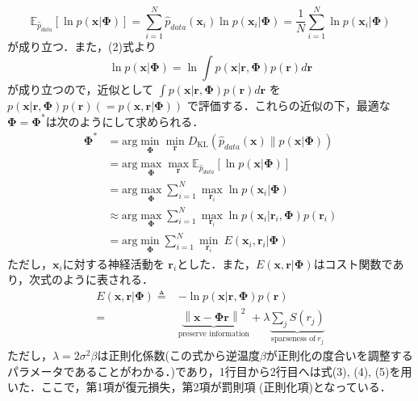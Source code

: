 \begin{equation}
\mathbb{E}_{\hat{p}_{data}} \left[\ln p(\mathbf{x}|\mathbf{\Phi})\right]=\sum_{i=1}^N \hat{p}_{data}(\mathbf{x}_i)\ln p(\mathbf{x}_i|\mathbf{\Phi})=\frac{1}{N}\sum_{i=1}^N \ln p(\mathbf{x}_i|\mathbf{\Phi})
\end{equation}
が成り立つ．また，(2)式より
\begin{equation}
\ln p(\mathbf{x}|\mathbf{\Phi})=\ln \int p(\mathbf{x}|\mathbf{r}, \mathbf{\Phi})p(\mathbf{r})d\mathbf{r}
\end{equation}
が成り立つので，近似として $\displaystyle \int p(\mathbf{x}|\mathbf{r}, \mathbf{\Phi})p(\mathbf{r})d\mathbf{r}$ を $p(\mathbf{x}|\mathbf{r}, \mathbf{\Phi})p(\mathbf{r}) \left(=p(\mathbf{x}, \mathbf{r}| \mathbf{\Phi})\right)$ で評価する．これらの近似の下，最適な$\mathbf{\Phi}=\mathbf{\Phi}^*$は次のようにして求められる．
\begin{align}
\mathbf{\Phi}^*&=\text{arg} \min_{\mathbf{\Phi}} \min_{\mathbf{r}} D_{\text{KL}}\left(\hat{p}_{data}(\mathbf{x}) \| p(\mathbf{x}|\mathbf{\Phi})\right)\\
&=\text{arg} \max_{\mathbf{\Phi}} \max_{\mathbf{r}} \mathbb{E}_{\hat{p}_{data}} \left[\ln p(\mathbf{x}|\mathbf{\Phi})\right]\\
&= \text{arg} \max_{\mathbf{\Phi}}\sum_{i=1}^N \max_{\mathbf{r}_i} \ln p(\mathbf{x}_i|\mathbf{\Phi})\\
&\approx \text{arg} \max_{\mathbf{\Phi}}\sum_{i=1}^N \max_{\mathbf{r}_i} \ln p(\mathbf{x}_i|\mathbf{r}_i, \mathbf{\Phi})p(\mathbf{r}_i)\\
&=\text{arg}\min_{\mathbf{\Phi}} \sum_{i=1}^N \min_{\mathbf{r}_i}\ E(\mathbf{x}_i, \mathbf{r}_i|\mathbf{\Phi})
\end{align}
ただし，$\mathbf{x}_i$に対する神経活動を $\mathbf{r}_i$とした．また，$E(\mathbf{x}, \mathbf{r}|\mathbf{\Phi})$はコスト関数であり，次式のように表される．
\begin{align}
E(\mathbf{x}, \mathbf{r}|\mathbf{\Phi})\triangleq&-\ln p(\mathbf{x}|\mathbf{r}, \mathbf{\Phi})p(\mathbf{r})\\
=&\underbrace{\left\|\mathbf{x}-\mathbf{\Phi} \mathbf{r}\right\|^2}_{\text{preserve information}} + \lambda \underbrace{\sum_j S\left(r_j\right)}_{\text{sparseness of}\ r_j}
\end{align}
ただし，$\lambda=2\sigma^2\beta$は正則化係数(この式から逆温度$\beta$が正則化の度合いを調整するパラメータであることがわかる．)であり，1行目から2行目へは式(3), (4), (5)を用いた．ここで，第1項が復元損失，第2項が罰則項 (正則化項)となっている．

